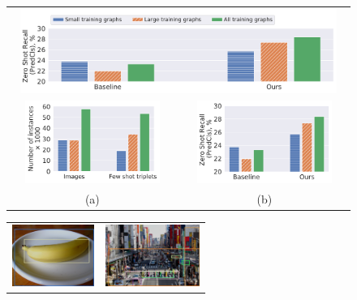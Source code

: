 \begin{figure}
	\scriptsize
	\centering
	\setlength{\tabcolsep}{3pt}
	{
		\begin{minipage}{0.5\linewidth}
			\hspace{-20pt}
			\begin{tabular}{cc}
				\multicolumn{2}{c}{{\hspace{30pt}\includegraphics[width=0.95\textwidth,trim={3.5cm 8.3cm 7cm 0.8cm},clip]{legend.pdf}}} \vspace{-3pt} \\
				\vspace{-3pt}
				\includegraphics[align=c,height=2.7cm]{large_graphs_train_labels.pdf} &
				\includegraphics[align=c,height=2.7cm]{large_graphs_vs_recall_predcls_zs.pdf} \\
				\hspace{20pt} (a) & \hspace{20pt} (b) 
			\end{tabular}
		\end{minipage}
	}
	\hspace{10pt}
	{
		\begin{minipage}{0.4\linewidth}
			\vspace{8pt}
			\begin{tabular}{p{3cm}p{3cm}}
				\centering
				\includegraphics[height=2cm, align=c]{2409758_stanford_nolabel.png} & \includegraphics[height=2cm, align=c]{1160208_stanford_nolabel.png} \Bstrut \\ 

\end{tabular}
\end{minipage}}
\end{figure}
